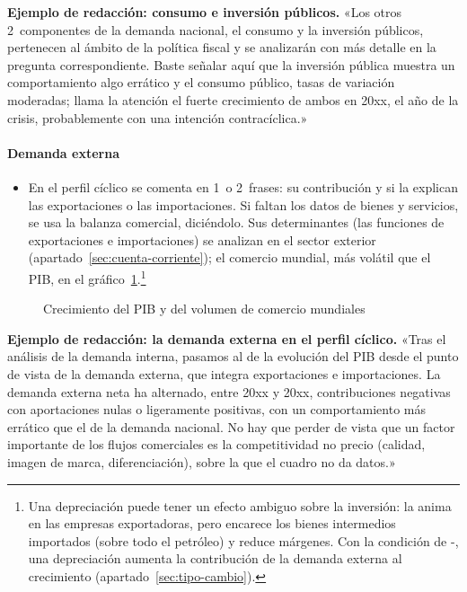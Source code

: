 \documentclass[11pt]{article}
\begin{document}
\begin{anotaciones}
\textbf{Ejemplo de redacción: consumo e inversión públicos.}
«Los otros 2~componentes de la demanda nacional, el consumo y la inversión públicos, pertenecen al ámbito de la política fiscal y se analizarán con más detalle en la pregunta correspondiente. Baste señalar aquí que la inversión pública muestra un comportamiento algo errático y el consumo público, tasas de variación moderadas; llama la atención el fuerte crecimiento de ambos en 20xx, el año de la crisis, probablemente con una intención contracíclica.»
\end{anotaciones}

\paragraph{Demanda externa}
\begin{itemize}
\item En el perfil cíclico se comenta en 1~o 2~frases: su contribución y si la explican las exportaciones o las importaciones. Si faltan los datos de bienes y servicios, se usa la balanza comercial, diciéndolo. Sus determinantes (las funciones de exportaciones e importaciones) se analizan en el sector exterior (apartado~\ref{sec:cuenta-corriente}); el comercio mundial, más volátil que el PIB, en el gráfico~\ref{fig:pib-comercio-mundial}.\footnote{Una depreciación puede tener un efecto ambiguo sobre la inversión: la anima en las empresas exportadoras, pero encarece los bienes intermedios importados (sobre todo el petróleo) y reduce márgenes. Con la condición de -, una depreciación aumenta la contribución de la demanda externa al crecimiento (apartado~\ref{sec:tipo-cambio}).}
\end{itemize}

\begin{figure}[!htb]
\centering
\caption{Crecimiento del PIB y del volumen de comercio mundiales}\label{fig:pib-comercio-mundial}
\end{figure}

\begin{anotaciones}
\textbf{Ejemplo de redacción: la demanda externa en el perfil cíclico.}
«Tras el análisis de la demanda interna, pasamos al de la evolución del PIB desde el punto de vista de la demanda externa, que integra exportaciones e importaciones. La demanda externa neta ha alternado, entre 20xx y 20xx, contribuciones negativas con aportaciones nulas o ligeramente positivas, con un comportamiento más errático que el de la demanda nacional. No hay que perder de vista que un factor importante de los flujos comerciales es la competitividad no precio (calidad, imagen de marca, diferenciación), sobre la que el cuadro no da datos.»
\end{anotaciones}
\end{document}
